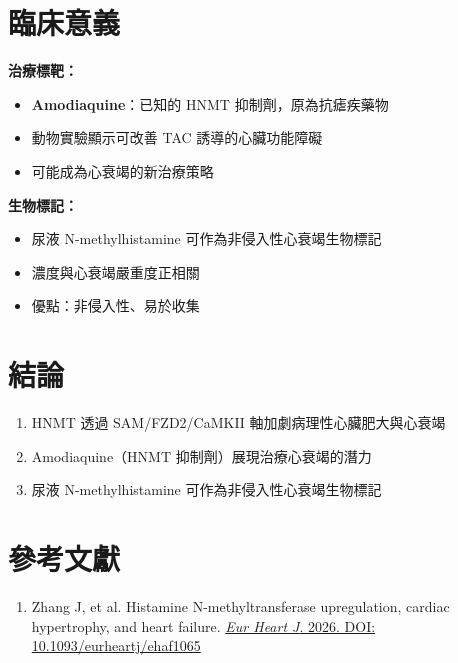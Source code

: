 \documentclass[12pt,a4paper]{article}
\begin{document}
\section{臨床意義}

\begin{importantbox}
\textbf{治療標靶：}
\begin{itemize}[noitemsep]
    \item \textbf{Amodiaquine}：已知的 HNMT 抑制劑，原為抗瘧疾藥物
    \item 動物實驗顯示可改善 TAC 誘導的心臟功能障礙
    \item 可能成為心衰竭的新治療策略
\end{itemize}

\vspace{0.3cm}

\textbf{生物標記：}
\begin{itemize}[noitemsep]
    \item 尿液 N-methylhistamine 可作為非侵入性心衰竭生物標記
    \item 濃度與心衰竭嚴重度正相關
    \item 優點：非侵入性、易於收集
\end{itemize}
\end{importantbox}

\section{結論}

\begin{enumerate}
    \item HNMT 透過 SAM/FZD2/CaMKII 軸加劇病理性心臟肥大與心衰竭
    \item Amodiaquine（HNMT 抑制劑）展現治療心衰竭的潛力
    \item 尿液 N-methylhistamine 可作為非侵入性心衰竭生物標記
\end{enumerate}

\section{參考文獻}

\begin{enumerate}
    \item Zhang J, et al. Histamine N-methyltransferase upregulation, cardiac hypertrophy, and heart failure. \href{https://doi.org/10.1093/eurheartj/ehaf1065}{\textit{Eur Heart J}. 2026. DOI: 10.1093/eurheartj/ehaf1065}
\end{enumerate}
\end{document}
